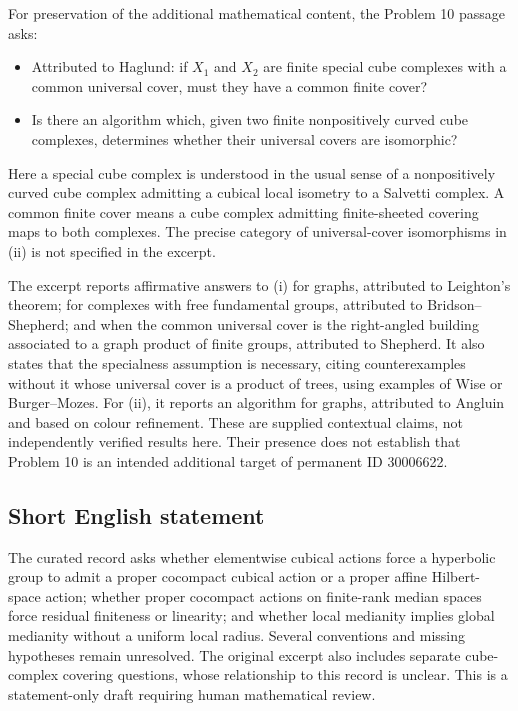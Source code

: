 \documentclass[11pt]{article}
\begin{document}
For preservation of the additional mathematical content, the Problem 10 passage asks:
\begin{itemize}
\item[(i)] Attributed to Haglund: if $X_1$ and $X_2$ are finite special cube complexes with a common universal cover, must they have a common finite cover?
\item[(ii)] Is there an algorithm which, given two finite nonpositively curved cube complexes, determines whether their universal covers are isomorphic?
\end{itemize}
Here a special cube complex is understood in the usual sense of a nonpositively curved cube complex admitting a cubical local isometry to a Salvetti complex. A common finite cover means a cube complex admitting finite-sheeted covering maps to both complexes. The precise category of universal-cover isomorphisms in (ii) is not specified in the excerpt.

The excerpt reports affirmative answers to (i) for graphs, attributed to Leighton's theorem; for complexes with free fundamental groups, attributed to Bridson--Shepherd; and when the common universal cover is the right-angled building associated to a graph product of finite groups, attributed to Shepherd. It also states that the specialness assumption is necessary, citing counterexamples without it whose universal cover is a product of trees, using examples of Wise or Burger--Mozes. For (ii), it reports an algorithm for graphs, attributed to Angluin and based on colour refinement. These are supplied contextual claims, not independently verified results here. Their presence does not establish that Problem 10 is an intended additional target of permanent ID 30006622.
\subsection{Short English statement}
The curated record asks whether elementwise cubical actions force a hyperbolic group to admit a proper cocompact cubical action or a proper affine Hilbert-space action; whether proper cocompact actions on finite-rank median spaces force residual finiteness or linearity; and whether local medianity implies global medianity without a uniform local radius. Several conventions and missing hypotheses remain unresolved. The original excerpt also includes separate cube-complex covering questions, whose relationship to this record is unclear. This is a statement-only draft requiring human mathematical review.
\end{document}
